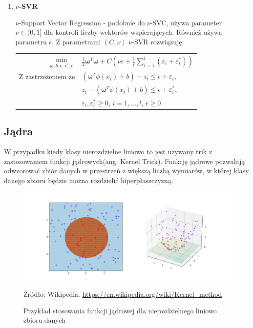 \documentclass[paper=a4, fontsize=11pt]{scrartcl} %
\numberwithin{equation}{section} %
\numberwithin{figure}{section} %
\newcommand*{\captionsource}[2]{%
  \caption[{#1}]{%
      #1}
    Źródło: #2%
}
\begin{document}
\begin{enumerate}
\item \textbf{$\nu$-SVR}
    \par $\nu$-Support Vector Regression - podobnie do $\nu$-SVC, używa parameter $\nu\in(0,1]$
    dla kontroli liczby wektorów wspierających. Również używa parametru $\epsilon$. Z parametrami
    $(C,\nu)$ $\nu$-SVR rozwiązuję:
    
    \begin{center}
        \begin{tabular}{rl}
            $\min\limits_{\pmb{\omega},b,\pmb{\epsilon},\pmb{\epsilon}^*,\epsilon}$ &
            $\frac{1}{2}\pmb{\omega}^T\pmb{\omega} + C(\nu\epsilon + \frac{1}{l}
            \sum\limits_{i=1}^{l}(\varepsilon_i+\varepsilon_i^*))$ \\
            Z zastrzeżeniem że & 
            $(\pmb{\omega}^T\phi(x_i) + b) - z_i \leq \epsilon + \varepsilon_i$,\\
           & $z_i - (\pmb{\omega}^T\phi(x_i) + b) \leq \epsilon + \varepsilon_i^*$,\\
           & $\varepsilon_i,\varepsilon_i^* \geq 0$, $i=1,...,l$, $\epsilon \geq 0$
        \end{tabular}
    \end{center}

\end{enumerate}
\subsection{Jądra}
    \par W przypadku kiedy klasy nierozdzielne liniowo to jest używany trik z zastosowaniem
    funkcji jądrowych(ang. Kernel Trick). Funkcję jądrowe pozwalają odwzorować zbiór danych
    w przestrzeń z większą liczbą wymiarów, w której klasy danego zbioru będzie można rozdzielić
    hiperpłaszczyzną. 

    \begin{figure}[H]
        \begin{center}
            \includegraphics[scale=0.2]{./img/kernel_trick.png}
        \captionsource{Przykład stosowania funkcji jądrowej dla nierozdzielnego liniowo zbioru
        danych}{Wikipedia. \url{https://en.wikipedia.org/wiki/Kernel_method}}
        \label{fig:kernel_trick}
        \end{center}
    \end{figure}
\end{document}
